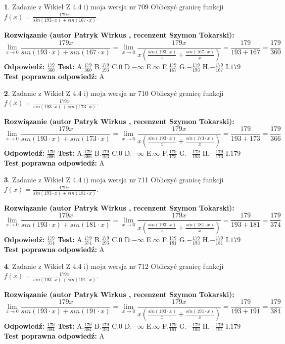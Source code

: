 \documentclass[12pt, a4paper]{article}
\theoremstyle{definition} %
\newtheorem{zad}{}
\newcommand{\zadStart}[1]{\begin{zad}#1\newline}
\newcommand{\zadStop}{\end{zad}}
\newcommand{\rozwStart}[2]{\noindent \textbf{Rozwiązanie (autor #1 , recenzent #2): }\newline}
\newcommand{\rozwStop}{\newline}
\newcommand{\odpStart}{\noindent \textbf{Odpowiedź:}\newline}
\newcommand{\odpStop}{\newline}
\newcommand{\testStart}{\noindent \textbf{Test:}\newline}
\newcommand{\testStop}{\newline}
\newcommand{\kluczStart}{\noindent \textbf{Test poprawna odpowiedź:}\newline}
\newcommand{\kluczStop}{\newline}
\begin{document}
\zadStart{Zadanie z Wikieł Z 4.4 i) moja wersja nr 709}
Obliczyć granicę funkcji $f(x)=\frac{179x}{sin(193\cdot x) +sin(167\cdot x)}$.
\zadStop
\rozwStart{Patryk Wirkus}{Szymon Tokarski}
$$\lim\limits_{x\to 0}\frac{179x}{sin(193\cdot x) +sin(167\cdot x)}=\lim\limits_{x\to 0}\frac{179x}{x(\frac{sin(193\cdot x)}{x}+\frac{sin(167\cdot x)}{x})}=\frac{179}{193+167} = \frac{179}{360}$$
\rozwStop
\odpStart
$\frac{179}{360}$
\odpStop
\testStart
A.$\frac{179}{360}$
B.$\frac{179}{193}$
C.$0$
D.$-\infty$
E.$\infty$
F.$\frac{179}{167}$
G.$-\frac{179}{193}$
H.$-\frac{179}{167}$
I.$179$
\testStop
\kluczStart
A
\kluczStop



\zadStart{Zadanie z Wikieł Z 4.4 i) moja wersja nr 710}
Obliczyć granicę funkcji $f(x)=\frac{179x}{sin(193\cdot x) +sin(173\cdot x)}$.
\zadStop
\rozwStart{Patryk Wirkus}{Szymon Tokarski}
$$\lim\limits_{x\to 0}\frac{179x}{sin(193\cdot x) +sin(173\cdot x)}=\lim\limits_{x\to 0}\frac{179x}{x(\frac{sin(193\cdot x)}{x}+\frac{sin(173\cdot x)}{x})}=\frac{179}{193+173} = \frac{179}{366}$$
\rozwStop
\odpStart
$\frac{179}{366}$
\odpStop
\testStart
A.$\frac{179}{366}$
B.$\frac{179}{193}$
C.$0$
D.$-\infty$
E.$\infty$
F.$\frac{179}{173}$
G.$-\frac{179}{193}$
H.$-\frac{179}{173}$
I.$179$
\testStop
\kluczStart
A
\kluczStop



\zadStart{Zadanie z Wikieł Z 4.4 i) moja wersja nr 711}
Obliczyć granicę funkcji $f(x)=\frac{179x}{sin(193\cdot x) +sin(181\cdot x)}$.
\zadStop
\rozwStart{Patryk Wirkus}{Szymon Tokarski}
$$\lim\limits_{x\to 0}\frac{179x}{sin(193\cdot x) +sin(181\cdot x)}=\lim\limits_{x\to 0}\frac{179x}{x(\frac{sin(193\cdot x)}{x}+\frac{sin(181\cdot x)}{x})}=\frac{179}{193+181} = \frac{179}{374}$$
\rozwStop
\odpStart
$\frac{179}{374}$
\odpStop
\testStart
A.$\frac{179}{374}$
B.$\frac{179}{193}$
C.$0$
D.$-\infty$
E.$\infty$
F.$\frac{179}{181}$
G.$-\frac{179}{193}$
H.$-\frac{179}{181}$
I.$179$
\testStop
\kluczStart
A
\kluczStop



\zadStart{Zadanie z Wikieł Z 4.4 i) moja wersja nr 712}
Obliczyć granicę funkcji $f(x)=\frac{179x}{sin(193\cdot x) +sin(191\cdot x)}$.
\zadStop
\rozwStart{Patryk Wirkus}{Szymon Tokarski}
$$\lim\limits_{x\to 0}\frac{179x}{sin(193\cdot x) +sin(191\cdot x)}=\lim\limits_{x\to 0}\frac{179x}{x(\frac{sin(193\cdot x)}{x}+\frac{sin(191\cdot x)}{x})}=\frac{179}{193+191} = \frac{179}{384}$$
\rozwStop
\odpStart
$\frac{179}{384}$
\odpStop
\testStart
A.$\frac{179}{384}$
B.$\frac{179}{193}$
C.$0$
D.$-\infty$
E.$\infty$
F.$\frac{179}{191}$
G.$-\frac{179}{193}$
H.$-\frac{179}{191}$
I.$179$
\testStop
\kluczStart
A
\kluczStop
\end{document}
